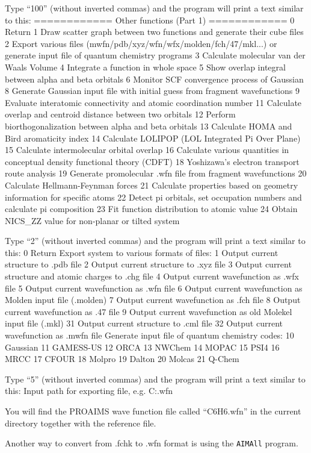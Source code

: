 \documentclass[a4paper,11pt,openany]{memoir}
\begin{document}
\begin{appendices}
\begin{consola}[	listing options={
		basicstyle=\ttfamily\tiny,
		numbers=left,
		numberstyle=\tiny\color{black}
	}]{Type ``100'' (without inverted commas) and the program will print a text similar to this:}
              ============ Other functions (Part 1) ============
0 Return
1 Draw scatter graph between two functions and generate their cube files
2 Export various files (mwfn/pdb/xyz/wfn/wfx/molden/fch/47/mkl...) or generate input file of quantum chemistry programs
3 Calculate molecular van der Waals Volume
4 Integrate a function in whole space
5 Show overlap integral between alpha and beta orbitals
6 Monitor SCF convergence process of Gaussian
8 Generate Gaussian input file with initial guess from fragment wavefunctions
9 Evaluate interatomic connectivity and atomic coordination number
11 Calculate overlap and centroid distance between two orbitals
12 Perform biorthogonalization between alpha and beta orbitals
13 Calculate HOMA and Bird aromaticity index
14 Calculate LOLIPOP (LOL Integrated Pi Over Plane)
15 Calculate intermolecular orbital overlap
16 Calculate various quantities in conceptual density functional theory (CDFT)
18 Yoshizawa's electron transport route analysis
19 Generate promolecular .wfn file from fragment wavefunctions
20 Calculate Hellmann-Feynman forces
21 Calculate properties based on geometry information for specific atoms
22 Detect pi orbitals, set occupation numbers and calculate pi composition
23 Fit function distribution to atomic value
24 Obtain NICS_ZZ value for non-planar or tilted system
\end{consola}
\begin{consola}{Type ``2'' (without inverted commas) and the program will print a text similar to this:}
0 Return
Export system to various formats of files:
1 Output current structure to .pdb file
2 Output current structure to .xyz file
3 Output current structure and atomic charges to .chg file
4 Output current wavefunction as .wfx file
5 Output current wavefunction as .wfn file
6 Output current wavefunction as Molden input file (.molden)
7 Output current wavefunction as .fch file
8 Output current wavefunction as .47 file
9 Output current wavefunction as old Molekel input file (.mkl)
31 Output current structure to .cml file
32 Output current wavefunction as .mwfn file
Generate input file of quantum chemistry codes:
10 Gaussian
11 GAMESS-US
12 ORCA               13 NWChem
14 MOPAC              15 PSI4
16 MRCC               17 CFOUR
18 Molpro             19 Dalton
20 Molcas             21 Q-Chem
\end{consola}
\begin{consola}{Type ``5'' (without inverted commas) and the program will print a text similar to this:}
Input path for exporting file, e.g. C:\ltwd.wfn
\end{consola}
You will find the PROAIMS wave function file called ``C6H6.wfn'' in the current directory together with the reference file.

Another way to convert from .fchk to .wfn format is using the \texttt{AIMAll} program.

\end{appendices}

%
%
\end{document}
